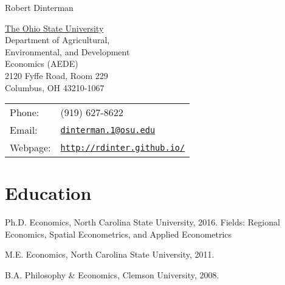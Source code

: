 \documentclass[letterpaper]{article}
\def\name{Robert Dinterman}
\renewenvironment{itemize}{
  \begin{list}{}{
    \setlength{\leftmargin}{1.5em}
  }
}{
  \end{list}
}
\begin{document}
{\huge \name}


\vspace{0.25in}

\begin{minipage}{0.45\linewidth}
  \href{http://aede.osu.edu/home}{The Ohio State University} \\
  Department of Agricultural, \\
  Environmental, and Development \\
  Economics (AEDE) \\
  2120 Fyffe Road, Room 229 \\
  Columbus, OH 43210-1067
\end{minipage}
\begin{minipage}{0.5\linewidth}
  \begin{tabular}{ll}
    Phone: & (919) 627-8622 \\
    Email: & \href{mailto:dinterman.1@osu.edu}{\tt dinterman.1@osu.edu} \\
    Webpage: & \href{http://rdinter.github.io/}{\tt http://rdinter.github.io/} \\
  \end{tabular}
\end{minipage}


% 
% 

\section*{Education}

\begin{itemize}
  \item Ph.D. Economics, North Carolina State University, 2016.
    \subitem Fields: Regional Economics, Spatial Econometrics, and Applied Econometrics

  \item M.E. Economics, North Carolina State University, 2011.

  \item B.A. Philosophy \& Economics, Clemson University, 2008.
\end{itemize}
\end{document}
